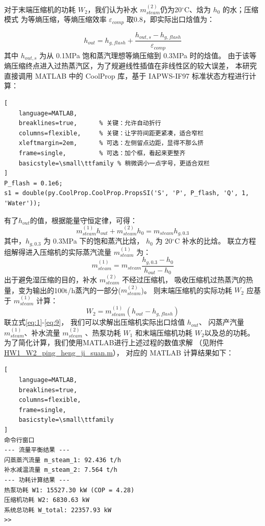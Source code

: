 \documentclass{thuemp}
\begin{document}
对于末端压缩机的功耗 $W_2$，我们认为补水
$m_{steam}^{(2)}$仍为20$^\circ$C、焓为 $h_0$ 的水；压缩模式
为等熵压缩，等熵压缩效率 $\varepsilon_{comp}$ 取0.8，即实际出口焓值为：

\begin{equation}\label{eq:5}
    h_{out} = h_{g,flash} + \frac{h_{out,s} - h_{g,flash}}{\varepsilon_{comp}}
\end{equation}
其中 $h_{out,s}$ 为从 0.1MPa 饱和蒸汽理想等熵压缩到 0.3MPa 时的焓值。
由于该等熵压缩终点进入过热蒸汽区，为了规避线性插值在非线性区的较大误差，
本研究直接调用 MATLAB 中的 CoolProp 库，基于 IAPWS-IF97 标准状态方程进行计算：
\begin{lstlisting}[
    language=MATLAB,
    breaklines=true,      % 关键：允许自动折行
    columns=flexible,     % 关键：让字符间距更紧凑，适合窄栏
    xleftmargin=2em,      % 可选：左侧留点边距，显得不那么挤
    frame=single,         % 可选：加个框，看起来更整齐
    basicstyle=\small\ttfamily % 稍微调小一点字号，更适合双栏
]
P_flash = 0.1e6;
s1 = double(py.CoolProp.CoolProp.PropsSI('S', 'P', P_flash, 'Q', 1, 'Water'));
\end{lstlisting}
有了$h_{out}$的值，根据能量守恒定律，可得：
\begin{equation}\label{eq:7}
 m_{steam}^{(1)} h_{out} + m_{steam}^{(2)} h_0 = m_{steam} h_{g,0.3}
\end{equation}
其中，$h_{g,0.3}$ 为 0.3MPa 下的饱和蒸汽比焓，
$h_0$ 为 20$^\circ$C 补水的比焓。
联立方程组解得进入压缩机的实际蒸汽流量 $m_{steam}^{(1)}$ 为：
\begin{equation}\label{eq:8}
    m_{steam}^{(1)} = m_{steam} \frac{h_{g,0.3} - h_0}{h_{out} - h_0}
\end{equation}
出于避免湿压缩的目的，补水 $m_{steam}^{(2)}$ 不经过压缩机，
吸收压缩机过热蒸汽的热量，变为输出的100t/h蒸汽的一部分($m_{steam}^{(2)}$)。
则末端压缩机的实际功耗 $W_2$ 应基于 $m_{steam}^{(1)}$ 计算：
\begin{equation}\label{eq:9}
    W_2 = m_{steam}^{(1)} (h_{out} - h_{g,flash})
\end{equation}
联立式\ref{eq:1}-\ref{eq:9}，
我们可以求解出压缩机实际出口焓值 $h_{out}$、
闪蒸产汽量 $m_{steam}^{(1)}$、补水流量 $m_{steam}^{(2)}$
、热泵功耗 $W_1$ 和末端压缩机功耗 $W_2$以及总的功耗。
为了简化计算，我们使用MATLAB进行上述过程的数值求解
（见附件\url{HW1_W2_ping_heng_ji_suan.m}），
对应的 MATLAB 计算结果如下：
\begin{lstlisting}[
    language=MATLAB,
    breaklines=true,
    columns=flexible,
    frame=single,
    basicstyle=\small\ttfamily
]
命令行窗口
--- 流量平衡结果 ---
闪蒸蒸汽流量 m_steam_1: 92.436 t/h
补水减温流量 m_steam_2: 7.564 t/h
--- 功耗计算结果 ---
热泵功耗 W1: 15527.30 kW (COP = 4.28)
压缩机功耗 W2: 6830.63 kW
系统总功耗 W_total: 22357.93 kW
>>
\end{lstlisting}
\end{document}
